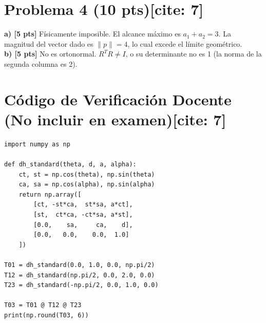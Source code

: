 \documentclass[11pt, a4paper]{article}
\begin{document}
\section*{Problema 4 (10 pts)[cite: 7]}
\textbf{a) [5 pts]} Físicamente imposible. El alcance máximo es $a_1+a_2 = 3$. La magnitud del vector dado es $\|p\| = 4$, lo cual excede el límite geométrico. \\
\textbf{b) [5 pts]} No es ortonormal. $R^TR \neq I$, o su determinante no es 1 (la norma de la segunda columna es 2).

\section*{Código de Verificación Docente (No incluir en examen)[cite: 7]}
\begin{lstlisting}
import numpy as np

def dh_standard(theta, d, a, alpha):
    ct, st = np.cos(theta), np.sin(theta)
    ca, sa = np.cos(alpha), np.sin(alpha)
    return np.array([
        [ct, -st*ca,  st*sa, a*ct],
        [st,  ct*ca, -ct*sa, a*st],
        [0.0,    sa,     ca,    d],
        [0.0,   0.0,    0.0,  1.0]
    ])

T01 = dh_standard(0.0, 1.0, 0.0, np.pi/2)
T12 = dh_standard(np.pi/2, 0.0, 2.0, 0.0)
T23 = dh_standard(-np.pi/2, 0.0, 1.0, 0.0)

T03 = T01 @ T12 @ T23
print(np.round(T03, 6))
\end{lstlisting}
\end{document}
